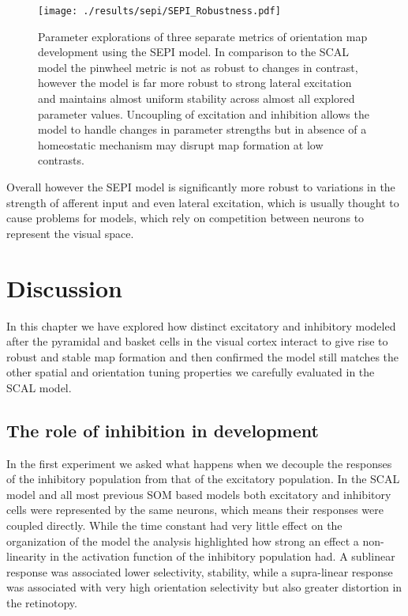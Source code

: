 \begin{figure}
	\centering
        \texttt{[image: ./results/sepi/SEPI\_Robustness.pdf]}
	\caption{Parameter explorations of three separate metrics of
          orientation map development using the SEPI model. In
          comparison to the SCAL model the pinwheel metric is not as
          robust to changes in contrast, however the model is far more
          robust to strong lateral excitation and maintains almost
          uniform stability across almost all explored parameter
          values. Uncoupling of excitation and inhibition allows the
          model to handle changes in parameter strengths but in
          absence of a homeostatic mechanism may disrupt map formation
          at low contrasts.}
	\label{SEPIStability}
\end{figure}

Overall however the SEPI model is significantly more robust to
variations in the strength of afferent input and even lateral
excitation, which is usually thought to cause problems for models,
which rely on competition between neurons to represent the visual
space.

\section{Discussion}

In this chapter we have explored how distinct excitatory and
inhibitory modeled after the pyramidal and basket cells in the visual
cortex interact to give rise to robust and stable map formation and
then confirmed the model still matches the other spatial and
orientation tuning properties we carefully evaluated in the SCAL
model.

\subsection{The role of inhibition in development}

In the first experiment we asked what happens when we decouple the
responses of the inhibitory population from that of the excitatory
population. In the SCAL model and all most previous SOM based models
both excitatory and inhibitory cells were represented by the same
neurons, which means their responses were coupled directly. While the
time constant had very little effect on the organization of the model
the analysis highlighted how strong an effect a non-linearity in the
activation function of the inhibitory population had. A sublinear
response was associated lower selectivity, stability, while a
supra-linear response was associated with very high orientation
selectivity but also greater distortion in the retinotopy.

